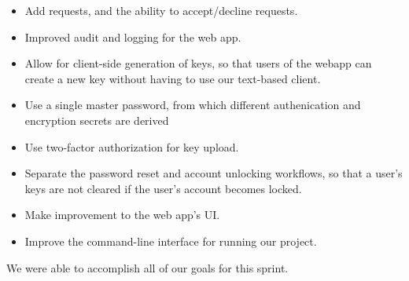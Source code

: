 \documentclass[a4paper,12pt]{article}
\begin{document}
\begin{itemize}
\item Add requests, and the ability to accept/decline requests.
\item Improved audit and logging for the web app.
\item Allow for client-side generation of keys, so that users of the webapp can create a new key without having to use our text-based client.
\item Use a single master password, from which different authenication and encryption secrets are derived
\item Use two-factor authorization for key upload.
\item Separate the password reset and account unlocking workflows, so that a user's keys are not cleared if the user's account becomes locked.
\item Make improvement to the web app's UI.
\item Improve the command-line interface for running our project.
\end{itemize}

\bigskip\noindent We were able to accomplish all of our goals for this sprint.
\end{document}
